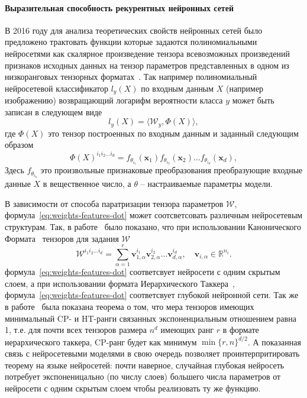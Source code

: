 \paragraph{Выразительная способность рекурентных нейронных сетей}
В 2016 году для анализа теоретических свойств нейронных сетей было предложено трактовать функции которые задаются полиномиальными нейросетями как скалярное произведение тензора всевозможных произведений признаков исходных данных на тензор параметров представленных в одном из низкоранговых тензорных форматах~\cite{cohen2016expressive}. Так например полиномиальный нейросетевой классификатор $l_y(X)$ по входным данным $X$ (например изображению) возвращающий логарифм вероятности класса $y$ может быть записан в следующем виде
\begin{equation}\label{eq:weights-features-dot}
l_y(X) = \langle  \mathcal{W}_y, \Phi(X) \rangle,
\end{equation}
где $\Phi(X)$ это тензор построенных по входным данным и заданный следующим образом
\begin{equation}\label{eq:feature-tens}
\Phi(X)^{i_1 i_2 \hdots i_d} = f_{\theta_{i_1}} (\textbf{x}_1) f_{\theta_{i_2}}(\textbf{x}_2) \hdots f_{\theta_{i_d}} (\textbf{x}_d),
\end{equation}
Здесь $f_{\theta_{i_k}}$ это произвольные признаковые преобразования преобразующие входные данные $X$ в вещественное число, а $\theta$ -- настраиваемые параметры модели.

В зависимости от способа паратризации тензора параметров $\mathcal{W}$, формула~\eqref{eq:weights-features-dot} может соотсветсовать различным нейросетевым структурам. Так, в работе~\cite{cohen2016expressive} было показано, что при использовании Канонического Формата~\cite{harshman1970foundations,carroll1970analysis} тензоров для задания $\mathcal{W}$
\begin{equation}\label{eq:candec}
\mathcal{W}^{i_1 i_2 \hdots i_d} = \sum_{\alpha=1}^{r} \textbf{v}_{1, \alpha}^{i_1}\textbf{v}_{2, \alpha}^{i_2} \hdots 
 \textbf{v}_{d, \alpha}^{i_d}, \quad \textbf{v}_{i, \alpha} \in \mathbb{R}^{n_i}.
\end{equation}
формула~\eqref{eq:weights-features-dot} соответсвует нейросети с одним скрытым слоем, а при использовании формата Иерархического Таккера~\cite{grasedyck2010hierarchical, grasedyck2011introduction, hackbusch2012tensor}, формула~\eqref{eq:weights-features-dot} соответсвует глубокой нейронной сети. Так же в работе~\cite{cohen2016expressive} была показана теорема о том, что мера тензоров имеющих минимальный CP- и HT-ранги связанных экспоненциальным отношением равна 1, т.е. для почти всех тензоров размера $n^d$ имеющих ранг $r$ в формате иерархического таккера, CP-ранг будет как минимум $\min\{r, n\}^{d/2}$. А показанная связь с нейросетевыми моделями в свою очередь позволяет проинтерпритировать теорему на языке нейросетей: почти наверное, случайная глубокая нейросеть потребует экспоненицально (по числу слоев) большего числа параметров от нейросети с одним скрытым слоем чтобы реализовать ту же функцию.


